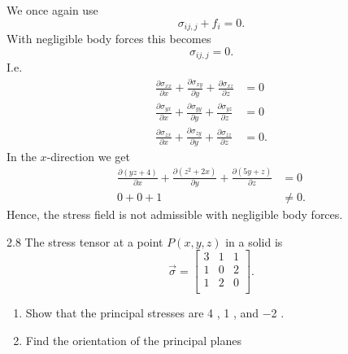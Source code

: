 \begin{derivation}
  We once again use
  \begin{equation*}
    \sigma_{ij,j} + f_i = 0
  .\end{equation*}
  With negligible body forces this becomes
  \begin{equation*}
    \sigma_{ij,j} = 0
  .\end{equation*}
  I.e.
  \begin{align*}
    \frac{\partial \sigma_{ x x}}{\partial x} + \frac{\partial \sigma_{xy}}{\partial y} + \frac{\partial \sigma_{xz}}{\partial z} &= 0 \\
    \frac{\partial \sigma_{yx}}{\partial x} + \frac{\partial \sigma_{yy}}{\partial y} + \frac{\partial \sigma_{yz}}{\partial z} &= 0 \\
    \frac{\partial \sigma_{zx}}{\partial x} + \frac{\partial \sigma_{zy}}{\partial y} + \frac{\partial \sigma_{zz}}{\partial z} &= 0
  .\end{align*}
  In the $x$-direction we get
  \begin{align*}
    \frac{\partial (yz + 4)}{\partial x} + \frac{\partial (z^2 + 2x)}{\partial y} + \frac{\partial (5y + z)}{\partial z} &= 0 \\
    0 + 0 + 1 &\neq 0
  .\end{align*}
  Hence, the stress field is not admissible with negligible body forces.
\end{derivation}



\begin{problem}{2.8}
  The stress tensor at a point $P(x,y,z)$ in a solid is
  \begin{equation*}
    \Vec{\sigma} = \begin{bmatrix}
      3 & 1 & 1\\
    1 & 0 & 2\\
    1 & 2 & 0\\
    \end{bmatrix}
  .\end{equation*}
  \begin{enumerate}[label=(\alph*)]
    \item Show that the principal stresses are \num{4} , \num{1} , and \num{-2} .
    \item Find the orientation of the principal planes
  \end{enumerate}
\end{problem}

